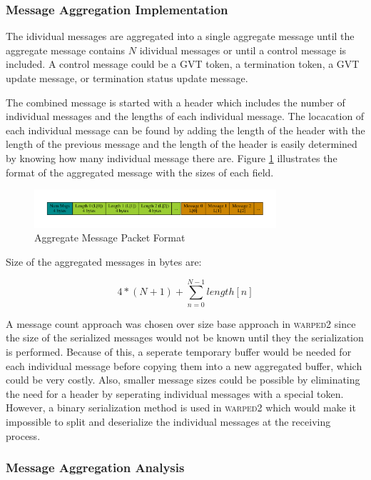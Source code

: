 \documentclass[11pt]{book}
\begin{document}
\subsubsection{Message Aggregation Implementation}

The idividual messages are aggregated into a single aggregate message until the aggregate message
contains $N$ idividual messages or until a control message is included.  A control message could be
a GVT token, a termination token, a GVT update message, or termination status update message.

The combined message is started with a header which includes the number of individual messages
and the lengths of each individual message.  The locacation of each individual message can be
found by adding the length of the header with the length of the previous message and the length
of the header is easily determined by knowing how many individual message there are.  Figure
\ref{aggregate_format} illustrates the format of the aggregated message with the sizes of each
field.

\begin{figure}
    \centering
    \includegraphics[width=0.8\textwidth,quiet]{figs/graphviz/aggregation_format.pdf}
    \caption{Aggregate Message Packet Format}\label{aggregate_format}
\end{figure}

Size of the aggregated messages in bytes are:

$$ 4 * (N + 1) + \sum_{n=0}^{N-1} length[n] $$

A message count approach was chosen over size base approach in \textsc{warped2} since the
size of the serialized messages would not be known until they the serialization is performed.
Because of this, a seperate temporary buffer would be needed for each individual message before
copying them into a new aggregated buffer, which could be very costly.  Also, smaller message
sizes could be possible by eliminating the need for a header by seperating individual messages
with a special token.  However, a binary serialization method is used in \textsc{warped2} which
would make it impossible to split and deserialize the individual messages at the receiving process.

\subsubsection{Message Aggregation Analysis}
\end{document}

